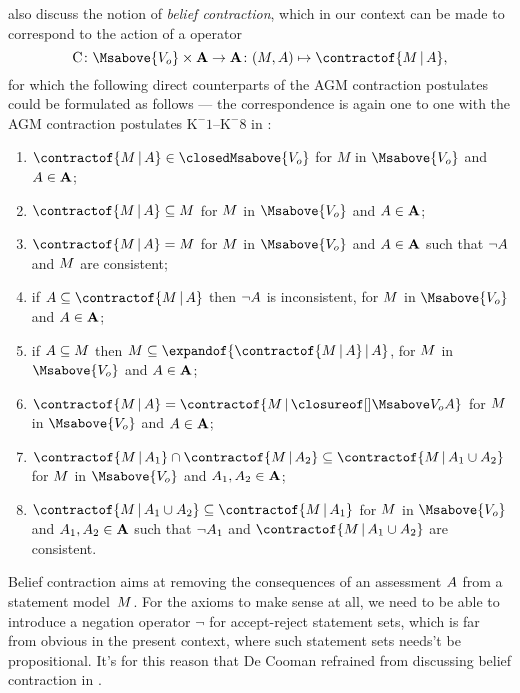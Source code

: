 \documentclass[preprint]{isipta2025}
\begin{document}
\citeauthor{alchourron1985} \cite{alchourron1985,gardenfors1988} also discuss the notion of \emph{belief contraction}, which in our context can be made to correspond to the action of a  operator
\begin{equation*}
\contract
\colon\Msabove{\zeroM}\times\As\to\As
\colon(\M,\A)\mapsto\contractof{\M\given\A},
\end{equation*}
for which the following direct counterparts of the AGM contraction postulates could be formulated as follows --- the correspondence is again one to one with the AGM contraction postulates \(\mathrm{K}^-1\)--\(\mathrm{K}^-8\) in \cite{gardenfors1988}:
\begin{enumerate}[label={\upshape BC\arabic*.},ref={\upshape BC\arabic*}, series=BC,widest=8,leftmargin=*,itemsep=0pt]
\item\label{axiom:contraction:1} \(\contractof{\M\given\A}\in\closedMsabove{\zeroM}\) for \(M\) in \(\Msabove{\zeroM}\) and \(A\in\mathbf{A}\);
\item\label{axiom:contraction:2} \(\contractof{\M\given\A}\subseteq\M\) for \(M\) in \(\Msabove{\zeroM}\) and \(A\in\mathbf{A}\);
\item\label{axiom:contraction:3} \(\contractof{\M\given\A}=\M\) for \(M\) in \(\Msabove{\zeroM}\) and \(A\in\mathbf{A}\) such that \(\neg A\) and \(M\) are consistent;
\item\label{axiom:contraction:4} if \(\A\subseteq\contractof{\M\given\A}\) then \(\neg A\) is inconsistent, for \(M\) in \(\Msabove{\zeroM}\) and \(A\in\mathbf{A}\);
\item\label{axiom:contraction:5} if \(A\subseteq M\) then \(\M\subseteq\expandof{\contractof{\M\given\A}\given\A}\), for \(M\) in \(\Msabove{\zeroM}\) and \(A\in\mathbf{A}\);
\item\label{axiom:contraction:6} \(\contractof{\M\given\A}=\contractof{\M\given\Mclsbgof{\zeroM}{\A}}\) for \(M\) in \(\Msabove{\zeroM}\) and \(A\in\mathbf{A}\);
\item\label{axiom:contraction:7} \(\contractof{\M\given\A_1}\intersection\contractof{\M\given\A_2}\subseteq\contractof{\M\given\A_1\union\A_2}\) for \(M\) in \(\Msabove{\zeroM}\) and \(A_1,A_2\in\mathbf{A}\);
\item\label{axiom:contraction:8} \(\contractof{\M\given\A_1\union\A_2}\subseteq\contractof{\M\given\A_1}\) for \(M\) in \(\Msabove{\zeroM}\) and \(A_1,A_2\in\mathbf{A}\) such that \(\neg A_1\) and \(\contractof{\M\given\A_1\union\A_2}\) are consistent.
\end{enumerate}
Belief contraction aims at removing the consequences of an assessment \(A\) from a statement model~\(M\).
For the axioms  to make sense at all, we need to be able to introduce a negation operator \(\neg\) for accept-reject statement sets, which is far from obvious in the present context, where such statement sets needs't be propositional.
It's for this reason that De Cooman refrained from discussing belief contraction in \cite{cooman2003a}.
\end{document}
